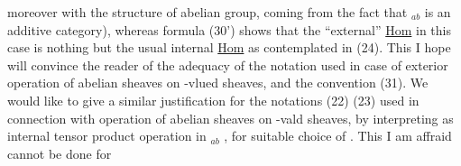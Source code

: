moreover with the structure of abelian group, coming from the fact that
$_{ab}$ is  an additive category), whereas formula (30') shows that the
``external'' \uline{Hom} in this case is nothing but the  usual internal \uline{Hom}
as contemplated in (24). This I hope will convince the reader of the
adequacy of the notation used \hand{(}in case of exterior  operation of
abelian sheaves on -vlued sheaves\hand{)}, and  the convention (31). We would
like to give a similar justification for the notations (22) (23) used in
connection with operation of abelian sheaves on -vald \hand{\uline{\textcolor{black}{co}}}sheaves,
by interpreting  as   internal  tensor product operation in
$_{ab}$ , for suitable choice of . This I am affraid cannot be done for

